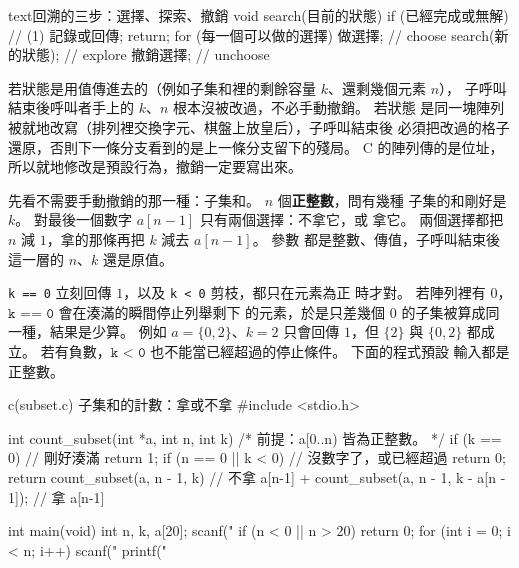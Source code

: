 \begin{code}{text}{回溯的三步：選擇、探索、撤銷}
void search(目前的狀態) {
    if (已經完成或無解) {         // (1)
        記錄或回傳;
        return;
    }
    for (每一個可以做的選擇) {
        做選擇;                    // choose
        search(新的狀態);          // explore
        撤銷選擇;                  // unchoose
    }
}
\end{code}

若狀態是用值傳進去的（例如子集和裡的剩餘容量 $k$、還剩幾個元素 $n$），
子呼叫結束後呼叫者手上的 $k$、$n$ 根本沒被改過，不必手動撤銷。 若狀態
是同一塊陣列被就地改寫（排列裡交換字元、棋盤上放皇后），子呼叫結束後
必須把改過的格子還原，否則下一條分支看到的是上一條分支留下的殘局。
C 的陣列傳的是位址，所以就地修改是預設行為，撤銷一定要寫出來。

先看不需要手動撤銷的那一種：子集和。 $n$ 個\textbf{正整數}，問有幾種
子集的和剛好是 $k$。 對最後一個數字 $a[n-1]$ 只有兩個選擇：不拿它，或
拿它。 兩個選擇都把 $n$ 減 $1$，拿的那條再把 $k$ 減去 $a[n-1]$。 參數
都是整數、傳值，子呼叫結束後這一層的 $n$、$k$ 還是原值。

\texttt{k == 0} 立刻回傳 $1$，以及 \texttt{k < 0} 剪枝，都只在元素為正
時才對。 若陣列裡有 $0$，$\texttt{k == 0}$ 會在湊滿的瞬間停止列舉剩下
的元素，於是只差幾個 $0$ 的子集被算成同一種，結果是少算。 例如
$a = \{0, 2\}$、$k = 2$ 只會回傳 $1$，但 $\{2\}$ 與 $\{0, 2\}$ 都成立。
若有負數，$\texttt{k < 0}$ 也不能當已經超過的停止條件。 下面的程式預設
輸入都是正整數。

\begin{example}{c}{(subset.c) 子集和的計數：拿或不拿}
#include <stdio.h>

int count_subset(int *a, int n, int k) {
    /* 前提：a[0..n) 皆為正整數。 */
    if (k == 0) {              // 剛好湊滿
        return 1;
    }
    if (n == 0 || k < 0) {     // 沒數字了，或已經超過
        return 0;
    }
    return count_subset(a, n - 1, k)                 // 不拿 a[n-1]
         + count_subset(a, n - 1, k - a[n - 1]);     // 拿 a[n-1]
}

int main(void) {
    int n, k, a[20];
    scanf("%
    if (n < 0 || n > 20) {
        return 0;
    }
    for (int i = 0; i < n; i++) {
        scanf("%
    }
    printf("%
}
\end{example}


